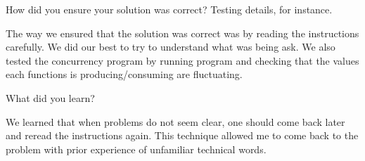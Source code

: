 \documentclass{article}
\newenvironment{question}[2][Question]{\begin{trivlist}
\item[\hskip \labelsep {\bfseries #1}\hskip \labelsep {\bfseries #2.}]}{\end{trivlist}}
\begin{document}

\vspace{0.25in} %

\begin{question}{3}
How did you ensure your solution was correct? Testing details, for instance. 
\end{question}
The way we ensured that the solution was correct was by reading the instructions carefully. We did our best to try to understand what was being ask. We also tested the concurrency program by running program and checking that the values each functions is producing/consuming are fluctuating. 



\vspace{0.25in}
\begin{question}{4}
What did you learn?
\end{question}
We learned that when problems do not seem clear, one should come back later and reread the instructions again. This technique allowed me to come back to the problem with prior experience of unfamiliar technical words. 


\end{document}
